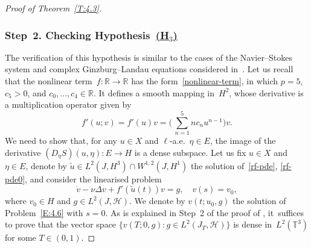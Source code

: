 \documentclass[11pt]{article}
\theoremstyle{plain}
\theoremstyle{definition}
\let\mathcal\mathscr
\theoremstyle{plain}
\numberwithin{equation}{section}
\newcommand{\R}{{\mathbb R}}
\newcommand{\T}{{\mathbb T}}
\newcommand{\HH}{{\mathcal H}}
\begin{document}
\begin{proof}[Proof of Theorem~\ref{T:4.3}]
\subsubsection*{Step~2. Checking Hypothesis~\protect\hyperlink{H3}{\rm(H$_3$)}}
The verification of this hypothesis is similar to the cases of the Navier--Stokes system and complex Ginzburg--Landau equations considered in~\cite[\S 4]{KNS-2020}. Let us recall that the nonlinear term~$f:\R\to\R$ has the form~\eqref{nonlinear-term}, in which $p=5$, $c_5>0$, and $c_0,\dots,c_4\in\R$. It defines a smooth mapping in~$H^2$, whose derivative is a multiplication operator given by
\[
f'(u;v)=f'(u)v=\biggl(\,\sum_{n=1}^5 n c_n u^{n-1}\biggr)v.
\]
We need to show that, for any $u\in X$ and $\ell$-a.e.~$\eta\in E$, the image of the derivative $(D_\eta S)(u,\eta):E\to H$ is a dense subspace. Let us fix $u\in X$ and $\eta\in E$, denote by $\tilde u\in L^2(J,H^3)\cap W^{1,2}(J,H^1)$ the solution of~\eqref{rf-pde}, \eqref{rf-pde0}, and consider the linearised problem\vspace*{-3pt}
\begin{equation} \label{E:4.6}
\dot v-\nu \Delta v+f'(\tilde u(t))v=g, \quad v(s)=v_0,
\end{equation}
where $v_0\in H$ and $g\in L^2(J,\HH)$. We denote by $v(t;u_0,g)$ the solution of Problem~\eqref{E:4.6} with $s=0$. As is explained in Step~2 of the proof of \cite[Th.\,4.7]{KNS-2020}, it~suffices to prove that the vector space $\{v(T;0,g): g\in L^2(J_T,\HH)\}$ is dense in~$L^2(\T^3)$ for some $T\in(0,1)$.


\end{proof}
\end{document}
